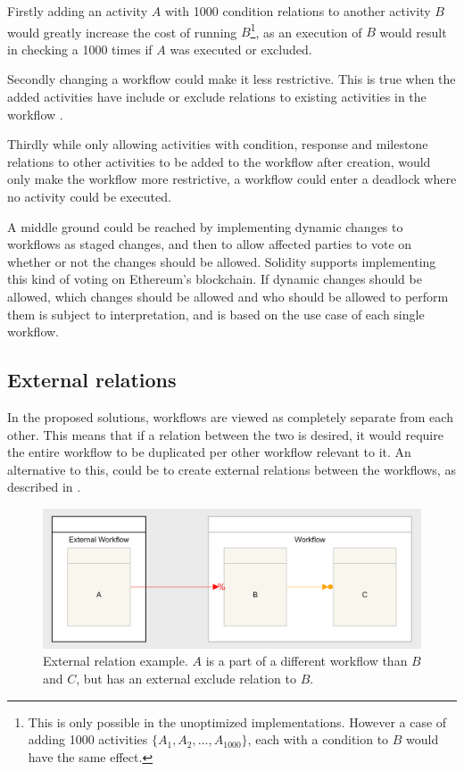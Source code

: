 \documentclass{article}
\begin{document}
			Firstly adding an activity $A$ with 1000 condition relations to another activity $B$ would greatly increase the cost of running $B$\footnote{This is only possible in the unoptimized implementations. However a case of adding 1000 activities $\{A_1, A_2, \dots, A_{1000}\}$, each with a condition to $B$ would have the same effect.}, as an execution of $B$ would result in checking a 1000 times if $A$ was executed or excluded. 

			Secondly changing a workflow could make it less restrictive. 
			This is true when the added activities have include or exclude relations to existing activities in the workflow \cite{dynamic-workflows}.

			Thirdly while only allowing activities with condition, response and milestone relations to other activities to be added to the workflow after creation, would only make the workflow more restrictive, a workflow could enter a deadlock where no activity could be executed.

			A middle ground could be reached by implementing dynamic changes to workflows as staged changes, and then to allow affected parties to vote on whether or not the changes should be allowed.
			Solidity supports implementing this kind of voting on Ethereum's blockchain.\cite{voting} 
			If dynamic changes should be allowed, which changes should be allowed and who should be allowed to perform them is subject to interpretation, and is based on the use case of each single workflow.

		\subsection{External relations}
		\label{sec:external-relations}
		In the proposed solutions, workflows are viewed as completely separate from each other. 
		This means that if a relation between the two is desired, it would require the entire workflow to be duplicated per other workflow relevant to it.
		An alternative to this, could be to create external relations between the workflows, as described in \cite{distributed-workflows}.

		\begin{figure}[!ht]
			\centering
			\includegraphics[scale=0.3]{figures/external-relations-example.png}
		 	\caption[External relation example]
		 	{External relation example. $A$ is a part of a different workflow than $B$ and $C$, but has an external exclude relation to $B$.}
		 	\label{fig:external-relations-example}
		\end{figure}
\end{document}
